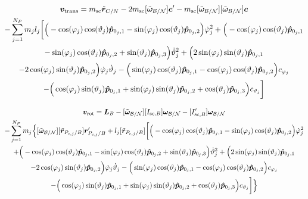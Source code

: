 \begin{multline}
	\bm v_{\text{trans}} = m_{\text{sc}}\ddot{\bm r}_{C/N} - 2m_{\text{sc}}[\tilde{\bm\omega}_{\cal B/N}] \bm c'
	-m_{\text{sc}}[\tilde{\bm\omega}_{\cal B/N}][\tilde{\bm\omega}_{\cal B/N}]\bm{c}
	\\-\sum_{j=1}^{N_{P}}m_j l_j \bigg[ 
	\Big(-\cos(\varphi_j)\cos(\vartheta_j)\bm{\hat{p}}_{0_j,1}-\sin(\varphi_j)\cos(\vartheta_j)\bm{\hat{p}}_{0_j,2}\Big)\dot{\varphi}_j^2
	+\Big(-\cos(\varphi_j)\cos(\vartheta_j)\bm{\hat{p}}_{0_j,1}\\-\sin(\varphi_j)\cos(\vartheta_j)\bm{\hat{p}}_{0_j,2}+\sin(\vartheta_j)\bm{\hat{p}}_{0_j,3} \Big)\dot{\vartheta}_j^2 +
	\Big(2\sin(\varphi_j)\sin(\vartheta_j)\bm{\hat{p}}_{0_j,1}\\ -2\cos(\varphi_j)\sin(\vartheta_j)\bm{\hat{p}}_{0_j,2}\Big)\dot{\varphi}_j\dot{\vartheta}_j
	-\Big(\sin(\varphi_j)\cos(\vartheta_j)\bm{\hat{p}}_{0_j,1}-\cos(\varphi_j)\cos(\vartheta_j)\bm{\hat{p}}_{0_j,2}\Big)c_{\varphi_j}\\ - \Big(\cos(\varphi_j)\sin(\vartheta_j)\bm{\hat{p}}_{0_j,1}+\sin(\varphi_j)\sin(\vartheta_j)\bm{\hat{p}}_{0_j,2}+\cos(\vartheta_j)\bm{\hat{p}}_{0_j,3}\Big) c_{\vartheta_j} 
	\bigg]
\end{multline}

\begin{multline}
	\bm v_{\text{rot}} = 	\bm{L}_B-[\bm{\tilde{\omega}}_{\cal B/N}] [I_{\text{sc},B}] \bm\omega_{\cal B/N}
	- [I'_{\text{sc},B}] \bm\omega_{\cal B/N}\\- \sum\limits_{j=1}^{N_P} m_j \Big\{[\tilde{\bm\omega}_{\cal B/N}] [\tilde{\bm{r}}_{P_{c,j}/B}] \bm{r}'_{P_{c,j}/B}
	+l_j[\tilde{\bm{r}}_{P_{c,j}/B}]\bigg[
	\Big(-\cos(\varphi_j)\cos(\vartheta_j)\bm{\hat{p}}_{0_j,1} -\sin(\varphi_j)\cos(\vartheta_j)\bm{\hat{p}}_{0_j,2}\Big)\dot{\varphi}_j^2
	\\+\Big(-\cos(\varphi_j)\cos(\vartheta_j)\bm{\hat{p}}_{0_j,1}-\sin(\varphi_j)\cos(\vartheta_j)\bm{\hat{p}}_{0_j,2}+\sin(\vartheta_j)\bm{\hat{p}}_{0_j,3} \Big)\dot{\vartheta}_j^2 +
	\Big(2\sin(\varphi_j)\sin(\vartheta_j)\bm{\hat{p}}_{0_j,1}\\ -2\cos(\varphi_j)\sin(\vartheta_j)\bm{\hat{p}}_{0_j,2}\Big)\dot{\varphi}_j\dot{\vartheta}_j
	-\Big(\sin(\varphi_j)\cos(\vartheta_j)\bm{\hat{p}}_{0_j,1} -\cos(\varphi_j)\cos(\vartheta_j)\bm{\hat{p}}_{0_j,2}\Big)c_{\varphi_j} \\-   \Big(\cos(\varphi_j)\sin(\vartheta_j)\bm{\hat{p}}_{0_j,1}+\sin(\varphi_j)\sin(\vartheta_j)\bm{\hat{p}}_{0_j,2}+\cos(\vartheta_j)\bm{\hat{p}}_{0_j,3}\Big) c_{\vartheta_j}
	\bigg]\Big\}
\end{multline}

